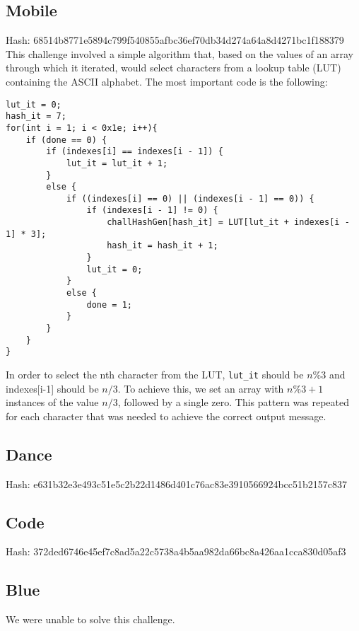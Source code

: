 \subsection{Mobile}
Hash: 68514b8771e5894c799f540855afbc36ef70db34d274a64a8d4271bc1f188379
This challenge involved a simple algorithm that, based on the values of an array through which it iterated, would select characters from a lookup table (LUT) containing the ASCII alphabet. The most important code is the following: 
\begin{lstlisting}
lut_it = 0;
hash_it = 7;
for(int i = 1; i < 0x1e; i++){
	if (done == 0) {
		if (indexes[i] == indexes[i - 1]) {
			lut_it = lut_it + 1;
		}
		else {
			if ((indexes[i] == 0) || (indexes[i - 1] == 0)) {
				if (indexes[i - 1] != 0) {
					challHashGen[hash_it] = LUT[lut_it + indexes[i - 1] * 3];
					hash_it = hash_it + 1;
				}
				lut_it = 0;
			}
			else {
				done = 1;
			}
		}
	}
}

\end{lstlisting}
In order to select the nth character from the LUT, \texttt{lut\_it} should be $n\%3$ and indexes[i-1] should be $n/3$. To achieve this, we set an array with $n\%3+1$ instances of the value $n/3$, followed by a single zero. This pattern was repeated for each character that was needed to achieve the correct output message. 

\subsection{Dance}
Hash: e631b32e3e493c51e5c2b22d1486d401c76ac83e3910566924bcc51b2157c837

\subsection{Code}
Hash: 372ded6746e45ef7c8ad5a22c5738a4b5aa982da66bc8a426aa1cca830d05af3

\subsection{Blue}
We were unable to solve this challenge.
